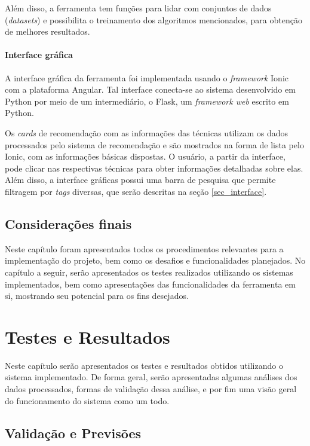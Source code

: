 \documentclass[
	12pt,				%
	oneside,			%
	a4paper,			%
	chapter=TITLE,		%
	english,			%
	french,				%
	spanish,			%
	brazil				%
	]{abntex2}
\begin{document}
Além disso, a ferramenta tem funções para lidar com conjuntos de dados (\emph{datasets}) e possibilita o treinamento dos algoritmos mencionados, para obtenção de melhores resultados.

\subsubsection{Interface gráfica}

A interface gráfica da ferramenta foi implementada usando o \emph{framework} Ionic com a plataforma Angular. Tal interface conecta-se ao sistema desenvolvido em Python por meio de um intermediário, o Flask, um \emph{framework web} escrito em Python.

Os \emph{cards} de recomendação com as informações das técnicas utilizam os dados processados pelo sistema de recomendação e são mostrados na forma de lista pelo Ionic, com as informações básicas dispostas. O usuário, a partir da interface, pode clicar nas respectivas técnicas para obter informações detalhadas sobre elas. Além disso, a interface gráficas possui uma barra de pesquisa que permite filtragem por \emph{tags} diversas, que serão descritas na seção \ref{sec_interface}.

\section{Considerações finais}

Neste capítulo foram apresentados todos os procedimentos relevantes para a implementação do projeto, bem como os desafios e funcionalidades planejados. No capítulo a seguir, serão apresentados os testes realizados utilizando os sistemas implementados, bem como apresentações das funcionalidades da ferramenta em si, mostrando seu potencial para os fins desejados.

\chapter{Testes e Resultados}\label{cap_testes}

Neste capítulo serão apresentados os testes e resultados obtidos utilizando o sistema implementado. De forma geral, serão apresentadas algumas análises dos dados processados, formas de validação dessa análise, e por fim uma visão geral do funcionamento do sistema como um todo.

\section{Validação e Previsões}
\end{document}
